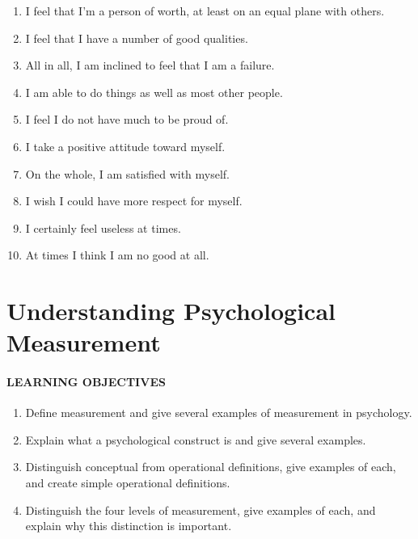\documentclass[
]{krantz}
\providecommand{\tightlist}{%
  \setlength{\itemsep}{0pt}\setlength{\parskip}{0pt}}
\begin{document}
\begin{enumerate}
\def\labelenumi{\arabic{enumi}.}
\tightlist
\item
  I feel that I'm a person of worth, at least on an equal plane with others.
\item
  I feel that I have a number of good qualities.
\item
  All in all, I am inclined to feel that I am a failure.
\item
  I am able to do things as well as most other people.
\item
  I feel I do not have much to be proud of.
\item
  I take a positive attitude toward myself.
\item
  On the whole, I am satisfied with myself.
\item
  I wish I could have more respect for myself.
\item
  I certainly feel useless at times.
\item
  At times I think I am no good at all.
\end{enumerate}

\hypertarget{understanding-psychological-measurement}{%
\section{Understanding Psychological Measurement}\label{understanding-psychological-measurement}}

\hypertarget{learning-objectives-15}{%
\paragraph*{LEARNING OBJECTIVES}\label{learning-objectives-15}}

\begin{enumerate}
\def\labelenumi{\arabic{enumi}.}
\tightlist
\item
  Define measurement and give several examples of measurement in psychology.
\item
  Explain what a psychological construct is and give several examples.
\item
  Distinguish conceptual from operational definitions, give examples of each, and create simple operational definitions.
\item
  Distinguish the four levels of measurement, give examples of each, and explain why this distinction is important.
\end{enumerate}
\end{document}
